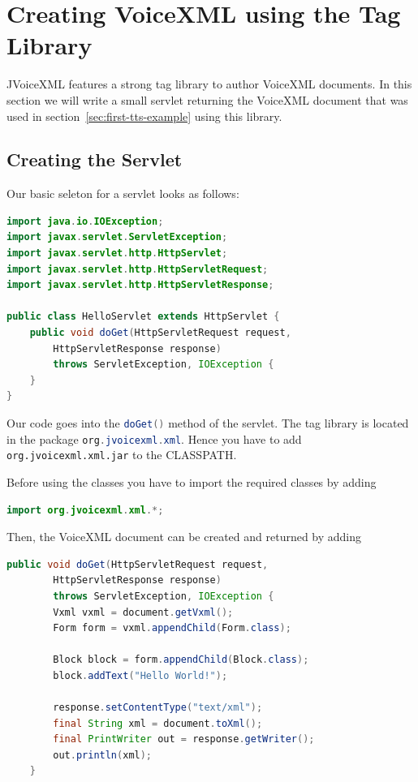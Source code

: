 \documentclass[11pt,a4paper]{book}
\begin{document}
\section{Creating VoiceXML using the Tag Library}

JVoiceXML features a strong tag library to author VoiceXML documents. In
this section we will write a small servlet returning the VoiceXML document that
was used in section~\ref{sec:first-tts-example} using this library.

\subsection{Creating the Servlet}

Our basic seleton for a servlet looks as follows:

\begin{lstlisting}[language=Java]
import java.io.IOException;
import javax.servlet.ServletException;
import javax.servlet.http.HttpServlet;
import javax.servlet.http.HttpServletRequest;
import javax.servlet.http.HttpServletResponse;

public class HelloServlet extends HttpServlet {
    public void doGet(HttpServletRequest request,
        HttpServletResponse response)
        throws ServletException, IOException {
    }
}
\end{lstlisting}

Our code goes into the \lstinline[language=Java]{doGet()} method of the servlet. The tag library
is located in the package \lstinline[language=Java]{org.jvoicexml.xml}. Hence you have to add
\texttt{org.jvoicexml.xml.jar} to the CLASSPATH.

Before using the classes you have to import the required classes by adding
\begin{lstlisting}[language=Java]
import org.jvoicexml.xml.*;
\end{lstlisting}

Then, the VoiceXML document can be created and returned by adding
\begin{lstlisting}[language=Java]
    public void doGet(HttpServletRequest request,
        HttpServletResponse response)
        throws ServletException, IOException {
        Vxml vxml = document.getVxml();
        Form form = vxml.appendChild(Form.class);

        Block block = form.appendChild(Block.class);
        block.addText("Hello World!");

        response.setContentType("text/xml");
        final String xml = document.toXml();
        final PrintWriter out = response.getWriter();
        out.println(xml);
    }
\end{lstlisting}
\end{document}
